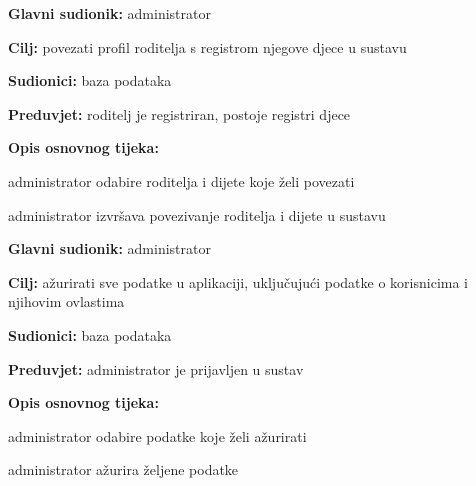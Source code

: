                     \noindent {}
					\begin{packed_item}
	
						\item \textbf{Glavni sudionik: }administrator
						\item  \textbf{Cilj:} povezati profil roditelja s registrom njegove djece u sustavu
						\item  \textbf{Sudionici:} baza podataka
						\item  \textbf{Preduvjet:} roditelj je registriran, postoje registri djece
						\item  \textbf{Opis osnovnog tijeka:}
						
						\item[] \begin{packed_enum}
	
							\item administrator odabire roditelja i dijete koje želi povezati
							\item administrator izvršava povezivanje roditelja i dijete u sustavu
						
						\end{packed_enum}
						
					\end{packed_item}
                    
        
                    \noindent {}
					\begin{packed_item}
	
						\item \textbf{Glavni sudionik: }administrator
						\item  \textbf{Cilj:} ažurirati sve podatke u aplikaciji, uključujući podatke o korisnicima i njihovim ovlastima
						\item  \textbf{Sudionici:} baza podataka
						\item  \textbf{Preduvjet:} administrator je prijavljen u sustav
						\item  \textbf{Opis osnovnog tijeka:}
						
						\item[] \begin{packed_enum}
	
							\item administrator odabire podatke koje želi ažurirati
							\item administrator ažurira željene podatke
						
						\end{packed_enum}
					
					\end{packed_item}

